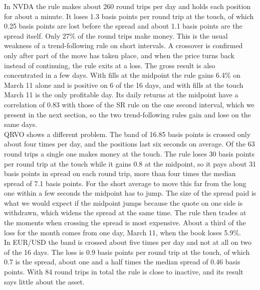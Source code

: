 \documentclass{article}
\begin{document}
\noindent In NVDA the rule makes about 260 round trips per day and holds each position for about a minute. It loses 1.3 basis points per round trip at the touch, of which 0.25 basis points are lost before the spread and about 1.1 basis points are the spread itself. Only 27\% of the round trips make money. This is the usual weakness of a trend-following rule on short intervals. A crossover is confirmed only after part of the move has taken place, and when the price turns back instead of continuing, the rule exits at a loss. The gross result is also concentrated in a few days. With fills at the midpoint the rule gains 6.4\% on March 11 alone and is positive on 6 of the 16 days, and with fills at the touch March 11 is the only profitable day. Its daily returns at the midpoint have a correlation of 0.83 with those of the SR rule on the one second interval, which we present in the next section, so the two trend-following rules gain and lose on the same days.\\

\noindent QRVO shows a different problem. The band of 16.85 basis points is crossed only about four times per day, and the positions last six seconds on average. Of the 63 round trips a single one makes money at the touch. The rule loses 30 basis points per round trip at the touch while it gains 0.8 at the midpoint, so it pays about 31 basis points in spread on each round trip, more than four times the median spread of 7.1 basis points. For the short average to move this far from the long one within a few seconds the midpoint has to jump. The size of the spread paid is what we would expect if the midpoint jumps because the quote on one side is withdrawn, which widens the spread at the same time. The rule then trades at the moments when crossing the spread is most expensive. About a third of the loss for the month comes from one day, March 11, when the book loses 5.9\%.\\

\noindent In EUR/USD the band is crossed about five times per day and not at all on two of the 16 days. The loss is 0.9 basis points per round trip at the touch, of which 0.7 is the spread, about one and a half times the median spread of 0.46 basis points. With 84 round trips in total the rule is close to inactive, and its result says little about the asset.\\
\end{document}
